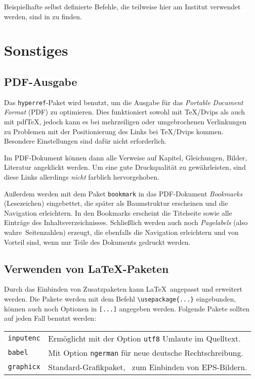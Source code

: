 Beispielhafte selbst definierte Befehle, die teilweise hier am Institut verwendet werden, sind in  zu finden.

\section{Sonstiges}
\subsection*{PDF-Ausgabe}
Das \verb|hyperref|-Paket wird benutzt, um  die Ausgabe für das \emph{Portable Document Format} (PDF) zu optimieren.
Dies funktioniert sowohl mit \TeX/Dvips als auch mit pdf\TeX, jedoch kann es bei mehrzeiligen oder umgebrochenen Verlinkungen zu Problemen mit der Positionierung des Links bei \TeX/Dvips kommen.
Besondere Einstellungen sind dafür nicht erforderlich.

Im PDF-Dokument können dann alle Verweise auf Kapitel, Gleichungen, Bilder, Literatur \usw angeklickt werden.
Um eine gute Druckqualität zu gewährleisten, sind diese Links allerdings \emph{nicht} farblich hervorgehoben.

Außerdem werden mit dem Paket \texttt{bookmark} in das PDF-Dokument \emph{Bookmarks} (Lesezeichen) eingebettet, die später als Baumstruktur erscheinen und die Navigation erleichtern.
In den Bookmarks erscheint die Titelseite sowie alle Einträge des Inhaltsverzeichnisses.
Schließlich werden auch noch \emph{Pagelabels} (also \glqq wahre\grqq\ Seitenzahlen) erzeugt, die ebenfalls die Navigation erleichtern und von Vorteil sind, wenn nur Teile des Dokuments gedruckt werden.


\subsection*{Verwenden von \LaTeX-Paketen}
Durch das Einbinden von Zusatzpaketen kann \LaTeX\ angepasst und erweitert werden.
Die Pakete werden mit dem Befehl \verb|\usepackage{...}| eingebunden, \ggf können auch noch Optionen in \verb|[...]| angegeben werden.
Folgende Pakete sollten auf jeden Fall benutzt werden:
\begin{tabular}{*{2}{@{\qquad}l}}
	\verb|inputenc|	&	Ermöglicht mit der Option \verb|utf8| Umlaute im Quelltext.\\
	\verb|babel|	&	Mit Option \verb|ngerman| für neue deutsche Rechtschreibung.\\
	\verb|graphicx|	&	Standard-Grafikpaket, \zB\ zum Einbinden von EPS-Bildern.\\
\end{tabular}

